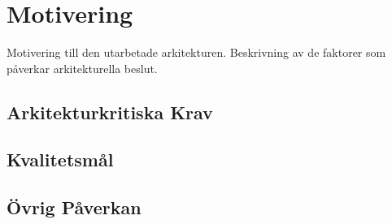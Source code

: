 \section{Motivering}
Motivering till den utarbetade arkitekturen. Beskrivning av de faktorer som påverkar arkitekturella beslut.

\subsection{Arkitekturkritiska Krav}

\subsection{Kvalitetsmål}

\subsection{Övrig Påverkan}
